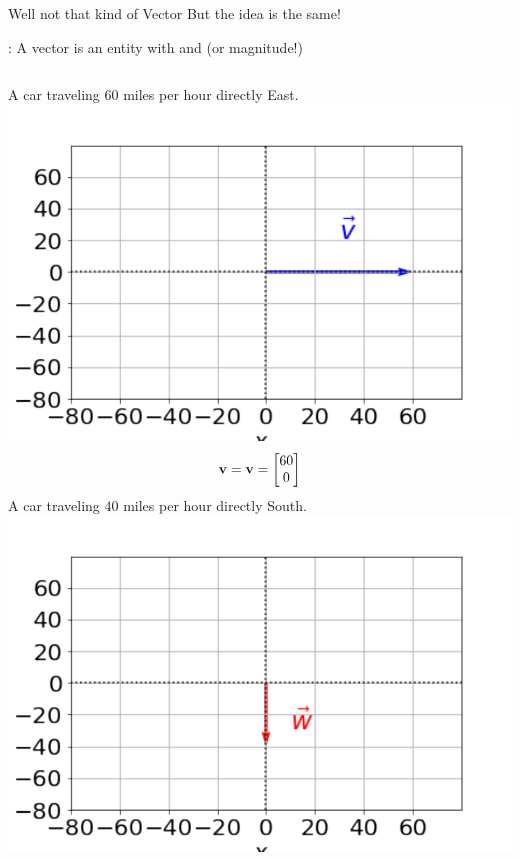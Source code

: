 \documentclass[xcoler=dvipsnames, aspectratio=169]{beamer}
\begin{document}
    \begin{frame}{Well not that kind of Vector}
        \small
        But the idea is the same!
        \begin{defn}
            : A vector is an entity with  and  (or magnitude!)
        \end{defn}
        \pause
        \begin{example}
            \begin{columns}
                \scriptsize
                A car traveling $60$ miles per hour directly East.
                \includegraphics[height=.3\textheight]{images/fig-east.pdf}
                \[
                    \vec{v} = \vecOld{v} = \begin{bmatrix}
                        60 \\ 0
                    \end{bmatrix}
                \]
                A car traveling $40$ miles per hour directly South.
                \includegraphics[height=.3\textheight]{images/fig-south.pdf}

\end{columns}
\end{example}
\end{frame}
\end{document}
